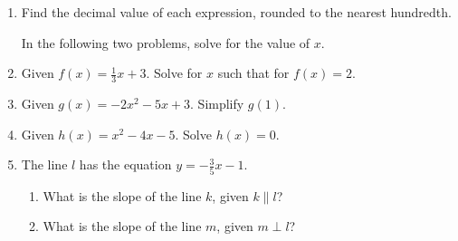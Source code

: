 \documentclass[12pt, twoside]{article}
\begin{document}
\newpage
\begin{enumerate}
\subsubsection*{Pre-Test: Linear \& quadratic functions on the coordinate plane}

  \item Find the decimal value of each expression, rounded to the nearest hundredth.
  \begin{enumerate}
  \end{enumerate}
 \vspace{0.5cm}

  In the following two problems, solve for the value of $x$.

\vspace{2cm}

  \item Given $f(x)=\frac{1}{3} x+3$. Solve for $x$ such that for $f(x)=2$. \vspace{2.5cm}
  \item Given $g(x)=-2x^2-5x+3$. Simplify $g(1)$. \vspace{2cm}
  \item Given $h(x)=x^2-4x-5$. Solve $h(x)=0$. \vspace{3cm}


  \item The line $l$ has the equation $y=-\frac{3}{5} x-1$.
    \begin{enumerate}
      \item What is the slope of the line $k$, given $k \parallel l$?
      \vspace{1cm}
      \item What is the slope of the line $m$, given $m \perp l$?
    \end{enumerate}




\end{enumerate}
\end{document}
